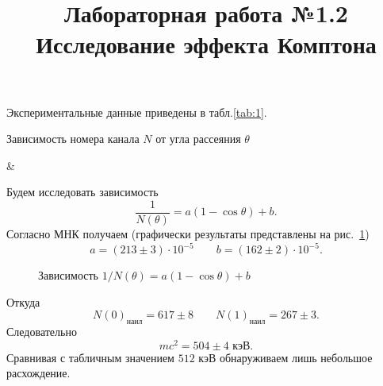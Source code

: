 \documentclass[a4paper]{article}
\title{Лабораторная работа №1.2\\
Исследование эффекта Комптона}
\begin{document}
	\maketitle
	Экспериментальные данные приведены в табл.\ref{tab:1}.
	\begin{table}[htpb]
		\centering
		\caption{Зависимость номера канала $N$ от
		угла рассеяния $\theta$}
		\label{tab:1}
		{\thetaexp & \Nexp}%
	\end{table}
	Будем исследовать зависимость
\[
	\frac{1}{N( \theta )}=a(1-\cos \theta )+b
.\] 
Согласно МНК получаем (графически результаты представлены на рис.~\ref{fig:1})
\[
	a=(213\pm 3)\cdot 10^{-5}\qquad 
	b=(162\pm 2) \cdot 10^{-5}
.\]\begin{figure}[htpb]
	\centering
{}
\caption{Зависимость $1 /N(\theta) = a(1-\cos \theta)+b$}
	\label{fig:1}
\end{figure}Откуда
\[
	N(0)_{\text{наил}}=617 \pm 8\qquad
	N(1)_\text{наил}= 267 \pm 3
.\] 
Следовательно
\[
mc^2= 504 \pm 4 \text{ кэВ}
.\] 
Сравнивая с табличным значением $512$ кэВ обнаруживаем лишь
небольшое расхождение.
\end{document}
